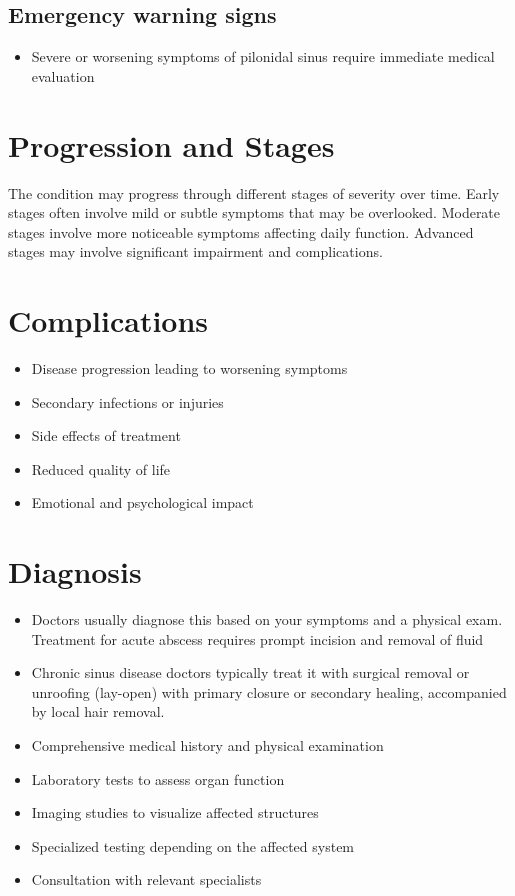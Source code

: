 \subsection{Emergency warning signs}
\begin{itemize}[noitemsep]
  \item Severe or worsening symptoms of pilonidal sinus require immediate medical evaluation
\end{itemize}
\section{Progression and Stages}
The condition may progress through different stages of severity over time. Early stages often involve mild or subtle symptoms that may be overlooked. Moderate stages involve more noticeable symptoms affecting daily function. Advanced stages may involve significant impairment and complications.
\section{Complications}
\begin{itemize}[noitemsep]
  \item Disease progression leading to worsening symptoms
  \item Secondary infections or injuries
  \item Side effects of treatment
  \item Reduced quality of life
  \item Emotional and psychological impact
\end{itemize}
\section{Diagnosis}
\begin{itemize}[noitemsep]
  \item Doctors usually diagnose this based on your symptoms and a physical exam. Treatment for acute abscess requires prompt incision and removal of fluid
  \item Chronic sinus disease doctors typically treat it with surgical removal or unroofing (lay-open) with primary closure or secondary healing, accompanied by local hair removal.
  \item Comprehensive medical history and physical examination
  \item Laboratory tests to assess organ function
  \item Imaging studies to visualize affected structures
  \item Specialized testing depending on the affected system
  \item Consultation with relevant specialists
\end{itemize}
